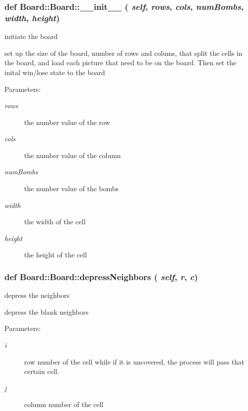 \subsubsection{\setlength{\rightskip}{0pt plus 5cm}def Board::Board::\_\-\_\-init\_\-\_\- ( {\em self},  {\em rows},  {\em cols},  {\em num\-Bombs},  {\em width},  {\em height})}\label{classBoard_1_1Board_98e0e9c51c8669bb8e2dc5c977524c8e}


initiate the board 

set up the size of the board, number of rows and colums, that split the cells in the board, and load each picture that need to be on the board. Then set the inital win/lose state to the board \begin{Desc}
\item[Parameters:]
\begin{description}
\item[{\em rows}]the number value of the row \item[{\em cols}]the number value of the column \item[{\em num\-Bombs}]the number value of the bombs \item[{\em width}]the width of the cell \item[{\em height}]the height of the cell \end{description}
\end{Desc}
\subsubsection{\setlength{\rightskip}{0pt plus 5cm}def Board::Board::depress\-Neighbors ( {\em self},  {\em r},  {\em c})}\label{classBoard_1_1Board_6d0deef8c8101277edbd855e7f5f9310}


depress the neighbors 

depress the blank neighbors \begin{Desc}
\item[Parameters:]
\begin{description}
\item[{\em i}]row number of the cell while if it is uncovered, the process will pass that certain cell. \item[{\em j}]column number of the cell \end{description}
\end{Desc}
